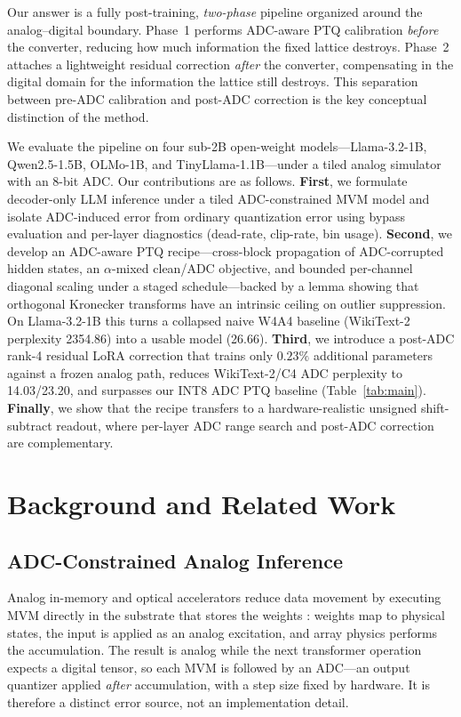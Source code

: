 \documentclass[letterpaper]{article} %
\theoremstyle{plain}
\begin{document}
Our answer is a fully post-training, \emph{two-phase} pipeline organized around the analog--digital boundary. Phase~1 performs ADC-aware PTQ calibration \emph{before} the converter, reducing how much information the fixed lattice destroys. Phase~2 attaches a lightweight residual correction \emph{after} the converter, compensating in the digital domain for the information the lattice still destroys. This separation between pre-ADC calibration and post-ADC correction is the key conceptual distinction of the method.

We evaluate the pipeline on four sub-2B open-weight models---Llama-3.2-1B, Qwen2.5-1.5B, OLMo-1B, and TinyLlama-1.1B---under a tiled analog simulator with an 8-bit ADC. Our contributions are as follows. \textbf{First}, we formulate decoder-only LLM inference under a tiled ADC-constrained MVM model and isolate ADC-induced error from ordinary quantization error using bypass evaluation and per-layer diagnostics (dead-rate, clip-rate, bin usage). \textbf{Second}, we develop an ADC-aware PTQ recipe---cross-block propagation of ADC-corrupted hidden states, an $\alpha$-mixed clean/ADC objective, and bounded per-channel diagonal scaling under a staged schedule---backed by a lemma showing that orthogonal Kronecker transforms have an intrinsic ceiling on outlier suppression. On Llama-3.2-1B this turns a collapsed naive W4A4 baseline (WikiText-2 perplexity 2354.86) into a usable model (26.66). \textbf{Third}, we introduce a post-ADC rank-4 residual LoRA correction that trains only $0.23\%$ additional parameters against a frozen analog path, reduces WikiText-2/C4 ADC perplexity to 14.03/23.20, and surpasses our INT8 ADC PTQ baseline (Table~\ref{tab:main}). \textbf{Finally}, we show that the recipe transfers to a hardware-realistic unsigned shift-subtract readout, where per-layer ADC range search and post-ADC correction are complementary.

\section{Background and Related Work}

\subsection{ADC-Constrained Analog Inference}

Analog in-memory and optical accelerators reduce data movement by executing MVM directly in the substrate that stores the weights \citep{xiao2021accuracy,spall2022hybrid,legallo2023mixed}: weights map to physical states, the input is applied as an analog excitation, and array physics performs the accumulation. The result is analog while the next transformer operation expects a digital tensor, so each MVM is followed by an ADC---an output quantizer applied \emph{after} accumulation, with a step size fixed by hardware. It is therefore a distinct error source, not an implementation detail.
\end{document}
